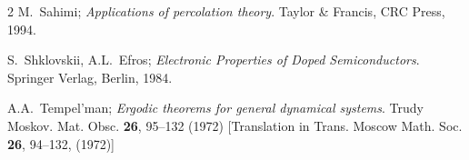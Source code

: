\documentclass[12pt,a4paper,reqno]{amsart}
\begin{document}
\begin{thebibliography}{2}
 M.~Sahimi; \emph{Applications of percolation theory}. Taylor \& Francis,
CRC Press, 1994.



S.~Shklovskii, A.L.~Efros; \emph{Electronic Properties of Doped Semiconductors}. Springer Verlag, Berlin, 1984.





 A.A.~Tempel'man; \emph{Ergodic theorems for general dynamical systems}. Trudy Moskov. Mat. Obsc. {\bf 26}, 95--132 (1972) [Translation in Trans. Moscow Math. Soc. {\bf 26}, 94--132, (1972)]


\end{thebibliography}
\end{document}
